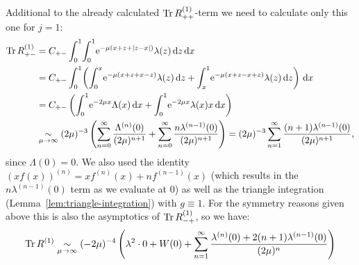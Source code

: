 Additional to the already calculated $\operatorname{Tr} R^{(1)}_{++}$-term we need to
calculate only this one for $j=1$:
\begin{align*}
  \Tr R^{(1)}_{+-} &= C_{+-} \Int{x}{
      \Int{z}{
        \Eto{-\mu(x+z+\Abs{z-x})}
        \lambda(z)
      }
    } \\
    &= C_{+-} \Int{x}{
      \left(
        \Integ[x]{0}{z}{
          \Eto{-\mu(x+z+x-z)}\lambda(z)
        }
      + \Integ[1]{x}{z}{
          \Eto{-\mu(x+z-x+z)} \lambda(z)
        }
      \right)
    } \\
    &= C_{+-} \left(
      \Int{x}{\Eto{-2\mu x} \Lambda(x)}
      + \Int{x}{\Eto{-2\mu x} \lambda(x)x}
      \right) \\
    &\SimAs{\mu\to\infty} %
      (2\mu)^{-3}\left(
      \Wsum{\Lambda^{(n)}} + \Wsum{n\lambda^{(n-1)}}\right)
      = (2\mu)^{-3} \Wsum[1]{(n+1)\lambda^{(n-1)}},
\end{align*}
since $\Lambda(0) = 0$. We also used the identity $(xf(x))^{(n)} = xf^{(n)}(x) +
nf^{(n-1)}(x)$ (which results in the $n\lambda^{(n-1)}(0)$ term as we evaluate
at $0$) as well as the triangle integration
(Lemma~\ref{lem:triangle-integration}) with $g \equiv 1$.
For the symmetry reasons given above this is also the asymptotics of $\operatorname{Tr}
R^{(1)}_{-+}$, so we have:
\begin{align}
  \label{eqn:tr1}
  \operatorname{Tr} R^{(1)} \mathrel{\underset{\mu\to\infty}{\sim}} (-2\mu)^{-4}
  \left(
    \lambda^2\cdot 0 + W(0) + \sum_{n=1}^\infty \frac{
      \lambda^{(n)}(0) + 2(n+1)\lambda^{(n-1)}(0)
    }{(2\mu)^n}
  \right)
\end{align}

